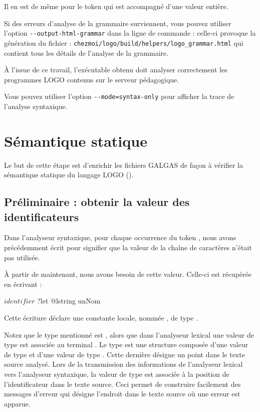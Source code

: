 Il en est de même pour le token  qui est accompagné d’une valeur entière.

Si des erreurs d'analyse de la grammaire surviennent, vous pouvez utiliser l'option \texttt{-{}-output-html-grammar} dans la ligne de commande : celle-ci provoque la génération du fichier : \texttt{chezmoi/logo/build/helpers/logo\_grammar.html} qui contient tous les détails de l'analyse de la grammaire.

À l'issue de ce travail, l'exécutable obtenu doit analyser correctement les programmes LOGO contenus sur le serveur pédagogique.

Vous pouvez utiliser l'option \texttt{-{}-mode=syntax-only} pour afficher la trace de l'analyse syntaxique.

\section{Sémantique statique}

Le but de cette étape est d'enrichir les fichiers GALGAS de façon à vérifier la sémantique statique du langage LOGO ().

\subsection{Préliminaire : obtenir la valeur des identificateurs}

Dans l’analyseur syntaxique, pour chaque occurrence du token , nous avons précédemment écrit  pour signifier que la valeur de la chaîne de caractères n’était pas utilisée.

À partir de maintenant, nous avons besoin de cette valeur. Celle-ci est récupérée en écrivant :

\begin{galgascode}
$identifier$ ?let @lstring unNom
\end{galgascode}


Cette écriture déclare une constante locale, nommée , de type .

Notez que le type mentionné est , alors que dans l’analyseur lexical une valeur de type  est associée au terminal . Le type  est une structure composée d’une valeur de type  et d’une valeur de type . Cette dernière désigne un point dans le texte source analysé. Lors de la transmission des informations de l’analyseur lexical vers l’analyseur syntaxique, la valeur de type  est associée à la position de l’identificateur dans le texte source. Ceci permet de construire facilement des messages d’erreur qui désigne l’endroit dans le texte source où une erreur est apparue.

